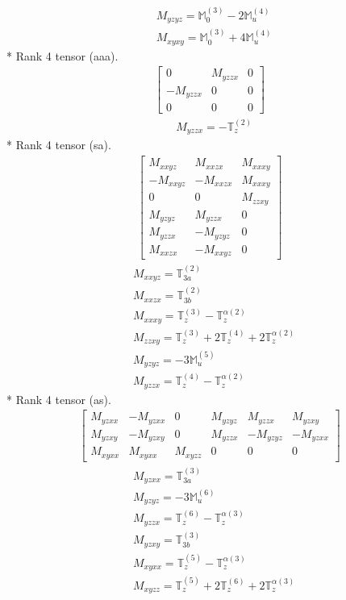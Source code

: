 \documentclass[fleqn,8pt,landscape]{jsarticle}
\begin{document}
\begin{align*}
& M_{yzyz} = \mathbb{M}_{0}^{(3)} - 2 \mathbb{M}_{u}^{(4)} \\
& M_{xyxy} = \mathbb{M}_{0}^{(3)} + 4 \mathbb{M}_{u}^{(4)}
\end{align*}
* Rank 4 tensor (aaa).
\begin{align*}
\begin{bmatrix} 0 & M_{yzzx} & 0 \\ - M_{yzzx} & 0 & 0 \\ 0 & 0 & 0 \end{bmatrix}
\end{align*}
\begin{align*}
& M_{yzzx} = - \mathbb{T}_{z}^{(2)}
\end{align*}
* Rank 4 tensor (sa).
\begin{align*}
\begin{bmatrix} M_{xxyz} & M_{xxzx} & M_{xxxy} \\ - M_{xxyz} & - M_{xxzx} & M_{xxxy} \\ 0 & 0 & M_{zzxy} \\ M_{yzyz} & M_{yzzx} & 0 \\ M_{yzzx} & - M_{yzyz} & 0 \\ M_{xxzx} & - M_{xxyz} & 0 \end{bmatrix}
\end{align*}
\begin{align*}
& M_{xxyz} = \mathbb{T}_{3a}^{(2)} \\
& M_{xxzx} = \mathbb{T}_{3b}^{(2)} \\
& M_{xxxy} = \mathbb{T}_{z}^{(3)} - \mathbb{T}_{z}^{\alpha(2)} \\
& M_{zzxy} = \mathbb{T}_{z}^{(3)} + 2 \mathbb{T}_{z}^{(4)} + 2 \mathbb{T}_{z}^{\alpha(2)} \\
& M_{yzyz} = - 3 \mathbb{M}_{u}^{(5)} \\
& M_{yzzx} = \mathbb{T}_{z}^{(4)} - \mathbb{T}_{z}^{\alpha(2)}
\end{align*}
* Rank 4 tensor (as).
\begin{align*}
\begin{bmatrix} M_{yzxx} & - M_{yzxx} & 0 & M_{yzyz} & M_{yzzx} & M_{yzxy} \\ M_{yzxy} & - M_{yzxy} & 0 & M_{yzzx} & - M_{yzyz} & - M_{yzxx} \\ M_{xyxx} & M_{xyxx} & M_{xyzz} & 0 & 0 & 0 \end{bmatrix}
\end{align*}
\begin{align*}
& M_{yzxx} = \mathbb{T}_{3a}^{(3)} \\
& M_{yzyz} = - 3 \mathbb{M}_{u}^{(6)} \\
& M_{yzzx} = \mathbb{T}_{z}^{(6)} - \mathbb{T}_{z}^{\alpha(3)} \\
& M_{yzxy} = \mathbb{T}_{3b}^{(3)} \\
& M_{xyxx} = \mathbb{T}_{z}^{(5)} - \mathbb{T}_{z}^{\alpha(3)} \\
& M_{xyzz} = \mathbb{T}_{z}^{(5)} + 2 \mathbb{T}_{z}^{(6)} + 2 \mathbb{T}_{z}^{\alpha(3)}
\end{align*}
\end{document}
